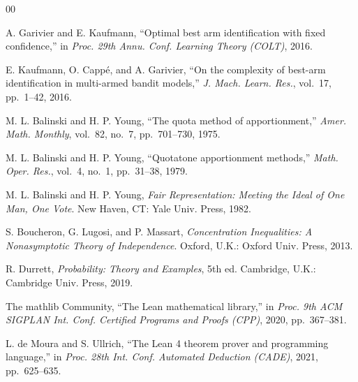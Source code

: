 \begin{thebibliography}{00}

 A. Garivier and E. Kaufmann, ``Optimal best arm identification with
fixed confidence,'' in \emph{Proc. 29th Annu. Conf. Learning Theory (COLT)}, 2016.

 E. Kaufmann, O. Capp\'e, and A. Garivier, ``On the complexity of
best-arm identification in multi-armed bandit models,'' \emph{J. Mach. Learn. Res.},
vol.~17, pp.~1--42, 2016.

 M. L. Balinski and H. P. Young, ``The quota method of
apportionment,'' \emph{Amer. Math. Monthly}, vol.~82, no.~7, pp.~701--730, 1975.

 M. L. Balinski and H. P. Young, ``Quotatone apportionment methods,''
\emph{Math. Oper. Res.}, vol.~4, no.~1, pp.~31--38, 1979.

 M. L. Balinski and H. P. Young, \emph{Fair Representation: Meeting the
Ideal of One Man, One Vote}. New Haven, CT: Yale Univ. Press, 1982.

 S. Boucheron, G. Lugosi, and P. Massart, \emph{Concentration
Inequalities: A Nonasymptotic Theory of Independence}. Oxford, U.K.: Oxford Univ. Press, 2013.

 R. Durrett, \emph{Probability: Theory and Examples}, 5th ed. Cambridge,
U.K.: Cambridge Univ. Press, 2019.

 The mathlib Community, ``The Lean mathematical library,'' in
\emph{Proc. 9th ACM SIGPLAN Int. Conf. Certified Programs and Proofs (CPP)}, 2020,
pp.~367--381.

 L. de Moura and S. Ullrich, ``The Lean 4 theorem prover and programming
language,'' in \emph{Proc. 28th Int. Conf. Automated Deduction (CADE)}, 2021, pp.~625--635.

\end{thebibliography}




